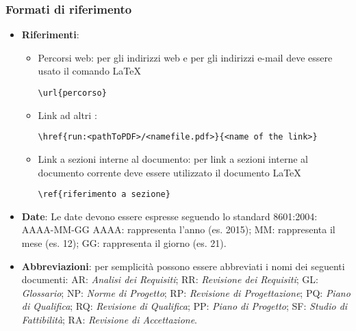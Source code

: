 \documentclass{scalatekids-article}
\begin{document}
\subsubsection{Formati di riferimento}
\begin{itemize}
\item \textbf{Riferimenti}:
  \begin{itemize}
  \item Percorsi web: per gli indirizzi web e per gli indirizzi e-mail deve essere usato il comando \LaTeX\xspace
    \begin{center}
      \verb=\url{percorso}=
    \end{center}
  \item Link ad altri :
    \begin{center}
      \verb=\href{run:<pathToPDF>/<namefile.pdf>}{<name of the link>}=
    \end{center}
  \item Link a sezioni interne al documento: per link a sezioni interne al documento corrente deve essere utilizzato il documento \LaTeX\xspace
    \begin{center}
      \verb=\ref{riferimento a sezione}=
    \end{center}
  \end{itemize}
\item \textbf{Date}: Le date devono essere espresse seguendo lo standard \textit{} 8601:2004:
  AAAA-MM-GG
  AAAA: rappresenta l'anno (es. 2015);
  MM:	rappresenta il mese (es. 12);
  GG: rappresenta il giorno (es. 21).

\item \textbf{Abbreviazioni}: per semplicità possono essere abbreviati i nomi dei seguenti documenti:
  AR: \textit{Analisi dei Requisiti};
  RR: \textit{Revisione dei Requisiti};
  GL: \textit{Glossario};
  NP: \textit{Norme di Progetto};
  RP: \textit{Revisione di Progettazione};
  PQ: \textit{Piano di Qualifica};
  RQ: \textit{Revisione di Qualifica};
  PP: \textit{Piano di Progetto};
  SF: \textit{Studio di Fattibilità};
  RA: \textit{Revisione di Accettazione}.


\end{itemize}
\end{document}

